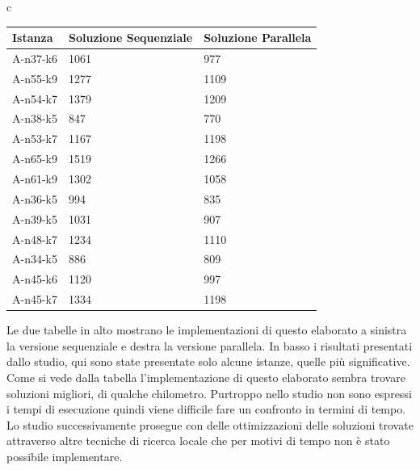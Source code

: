 \documentclass[]{article}
\begin{document}
\begin{tabular}{c}

	\begin{tabular}{||l | l l ||}
		
		\hline
		Istanza & Soluzione Sequenziale & Soluzione Parallela \\ [0.5ex] 
		\hline\hline
		A-n37-k6 & 1061 & 977 \\
		A-n55-k9 & 1277 & 1109 \\
		A-n54-k7 & 1379 & 1209 \\
		A-n38-k5 & 847 & 770  \\
		A-n53-k7 & 1167 & 1198  \\
		A-n65-k9 & 1519 & 1266  \\
		A-n61-k9 & 1302 & 1058 \\		
		A-n36-k5 & 994 & 835  \\
		A-n39-k5 & 1031 & 907 \\
		\rowcolor{green}
		A-n48-k7 & 	1234 & 1110  \\
		\rowcolor{green}
		A-n34-k5 & 886 & 809  \\
		\rowcolor{green}
		A-n45-k6 & 1120 & 997  \\
		\rowcolor{white}
		A-n45-k7 & 1334 & 1198  \\
		[1ex] 
		\hline
		
	\end{tabular}
\end{tabular}
Le due tabelle in alto mostrano le implementazioni di questo elaborato a sinistra la versione sequenziale e destra la versione parallela. In basso i risultati presentati dallo studio, qui sono state presentate solo alcune istanze, quelle più significative.
Come si vede dalla tabella l'implementazione di questo elaborato sembra trovare soluzioni migliori, di qualche chilometro. Purtroppo nello studio non sono espressi i tempi di esecuzione quindi viene difficile fare un confronto in termini di tempo.
Lo studio successivamente prosegue con delle ottimizzazioni delle soluzioni trovate attraverso altre tecniche di ricerca locale che per motivi di tempo non è stato possibile implementare.
\end{document}
